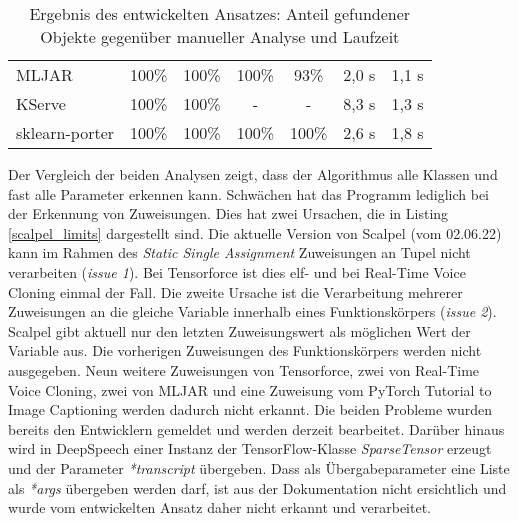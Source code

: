 \documentclass[german,bachelor]{swsLeipzig}
\begin{document}
\begin{table}[H]
\begin{center}
\begin{tabular}[h]{l|c|c|c|c|c|c}
MLJAR                              & 100\%                   & 100\%                         & 100\%             & 93\% & 2,0 s & 1,1 s\\
KServe                            & 100\%                     & 100\%                         & -                  & - & 8,3 s & 1,3 s\\
sklearn-porter                      & 100\%                   & 100\%                         & 100\%            & 100\% & 2,6 s & 1,8 s\\
\hline
\end{tabular}
\caption{Ergebnis des entwickelten Ansatzes: Anteil gefundener Objekte gegenüber manueller Analyse und Laufzeit} \label{analyse}
\end{center}
\end{table}

\noindent Der Vergleich der beiden Analysen zeigt, dass der Algorithmus alle Klassen und fast alle Parameter erkennen kann.
Schwächen hat das Programm lediglich bei der Erkennung von Zuweisungen.
Dies hat zwei Ursachen, die in Listing \ref{scalpel_limits} dargestellt sind.
Die aktuelle Version von Scalpel (vom 02.06.22) kann im Rahmen des \textit{Static Single Assignment} Zuweisungen an Tupel
nicht verarbeiten (\textit{issue 1}).
Bei Tensorforce ist dies elf- und bei Real-Time Voice Cloning einmal der Fall.
Die zweite Ursache ist die Verarbeitung mehrerer Zuweisungen an die gleiche Variable innerhalb eines Funktionskörpers (\textit{issue 2}).
Scalpel gibt aktuell nur den letzten Zuweisungswert als möglichen Wert der Variable aus.
Die vorherigen Zuweisungen des Funktionskörpers werden nicht ausgegeben.
Neun weitere Zuweisungen von Tensorforce, zwei von Real-Time Voice Cloning, zwei von MLJAR und
eine Zuweisung vom PyTorch Tutorial to Image Captioning werden dadurch nicht erkannt.
Die beiden Probleme wurden bereits den Entwicklern gemeldet und werden derzeit bearbeitet.
Darüber hinaus wird in DeepSpeech einer Instanz der TensorFlow-Klasse \textit{SparseTensor} erzeugt und der Parameter \textit{*transcript} übergeben.
Dass als Übergabeparameter eine Liste als \textit{*args} übergeben werden darf, ist aus der Dokumentation nicht ersichtlich
und wurde vom entwickelten Ansatz daher nicht erkannt und verarbeitet.\\
\end{document}
